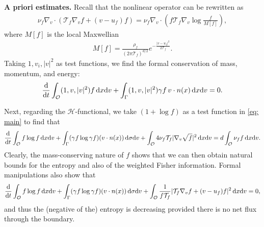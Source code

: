 \documentclass[10pt, reqno]{amsart}
\theoremstyle{plain}
\theoremstyle{definition}
\theoremstyle{remark}
\numberwithin{equation}{section}
\newcommand{\calH}{\mathcal H}
\newcommand{\calO}{\mathcal O}
\newcommand{\calT}{\mathcal T}
\newcommand{\dx}{\textnormal{d}x}
\newcommand{\dv}{\textnormal{d}v}
\newcommand{\ddt}{\frac{\textnormal{d}}{\textnormal{d}t}}
\newcommand{\tnd}{\textnormal{d}}
\newcommand{\lt}{\left}
\newcommand{\rt}{\right}
\begin{document}
\noindent
\textbf{A priori estimates.}  Recall that the nonlinear operator can be rewritten as
\begin{align*}
    \nu_f \nabla_v\cdot \lt(\calT_f \nabla_v f + (v-u_f)f \rt) = \nu_f \nabla_v\cdot \lt( f \calT_f \nabla_v \log \frac{f}{M[f]} \rt),
\end{align*}
where $M[f]$ is the local Maxwellian
\begin{align*}
M[f] = \frac{\rho_f}{(2\pi \calT_f)^{d/2}} e^{-\frac{|v-u_f|^2}{2\calT_f}}.
\end{align*}
Taking $1,v_i, |v|^2$ as test functions, we find the formal conservation of mass, momentum, and energy:
\begin{align*}
    \ddt \int_{\calO} (1,v, |v|^2) f \,\dx\dv + \int_{\Gamma} (1,v,|v|^2) \gamma f \,v\cdot n(x) \,\dx\dv  = 0.
\end{align*}
 

Next, regarding the $\calH$-functional, we take $(1+\log f)$ as a test function in \eqref{eq: main} to find that
\begin{align*}
 \ddt \int_{\calO} f\log f \,\dx\dv + \int_{\Gamma} (\gamma f \log \gamma f) (v\cdot n(x)) \,\tnd\sigma\dv + \int_{\calO} 4 \nu_f \calT_f |\nabla_v \sqrt{f}|^2 \,\dx\dv  = d\int_{\calO} \nu_f f\,\dx\dv.
\end{align*}
Clearly, the mass-conserving nature of $f$ shows that we can then obtain natural bounds for the entropy and also of the weighted Fisher information. Formal manipulations also show that
\begin{align*}
    \ddt \int_{\calO} f\log f \,\dx\dv+ \int_{\Gamma }(\gamma f \log \gamma f) (v\cdot n(x)) \,\tnd\sigma\dv + \int_{\calO} \frac{1}{f\calT_f}|\calT_f \nabla_v f + (v-u_f)f|^2 \,\dx\dv = 0,
\end{align*}
and thus the (negative of the) entropy is decreasing provided there is no net flux through the boundary.

%
%
%
%
%
%
\end{document}
